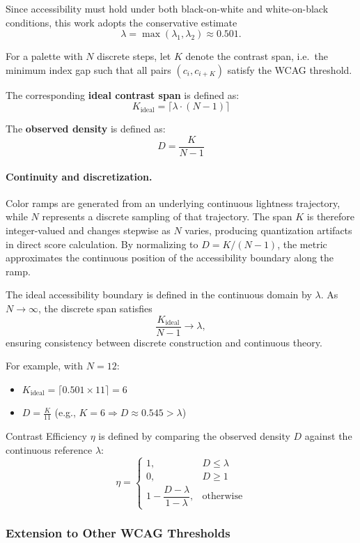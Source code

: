 Since accessibility must hold under both black-on-white and white-on-black conditions, this work adopts the conservative estimate
\[
\lambda = \max(\lambda_1,\lambda_2) \approx 0.501.
\]

For a palette with $N$ discrete steps, let $K$ denote the contrast span, i.e.\ the minimum index gap such that all pairs $(c_i, c_{i+K})$ satisfy the WCAG threshold.

The corresponding \textbf{ideal contrast span} is defined as:
\[
K_{\text{ideal}} = \lceil \lambda \cdot (N-1) \rceil
\]

The \textbf{observed density} is defined as:
\[
D = \frac{K}{N-1}
\]

\paragraph{Continuity and discretization.}
Color ramps are generated from an underlying continuous lightness trajectory, while $N$ represents a discrete sampling of that trajectory. The span $K$ is therefore integer-valued and changes stepwise as $N$ varies, producing quantization artifacts in direct score calculation. By normalizing to $D = K/(N-1)$, the metric approximates the continuous position of the accessibility boundary along the ramp.

The ideal accessibility boundary is defined in the continuous domain by $\lambda$. As $N \to \infty$, the discrete span satisfies
\[
\frac{K_{\text{ideal}}}{N-1} \to \lambda,
\]
ensuring consistency between discrete construction and continuous theory.

For example, with $N=12$:
\begin{itemize}
\item $K_{\text{ideal}} = \lceil 0.501 \times 11 \rceil = 6$
\item $D = \frac{K}{11}$ (e.g., $K=6 \Rightarrow D \approx 0.545 > \lambda$)
\end{itemize}

Contrast Efficiency $\eta$ is defined by comparing the observed density $D$ against the continuous reference $\lambda$:
\[
\eta =
\begin{cases}
1, & D \le \lambda \\
0, & D \ge 1 \\
1 - \dfrac{D - \lambda}{1 - \lambda}, & \text{otherwise}
\end{cases}
\]



\subsubsection*{Extension to Other WCAG Thresholds}

